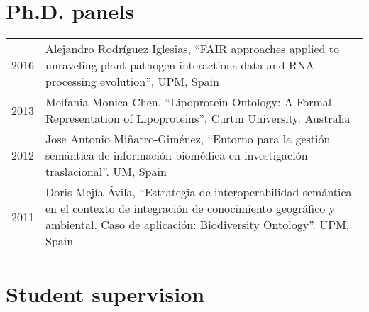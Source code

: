 \documentclass[11pt,fullpage]{article}
\begin{document}
\section*{Ph.D. panels}

\begin{longtable}{p{0.5in}|p{5.5in}}

2016 & Alejandro Rodr\'iguez Iglesias, ``FAIR approaches applied to unraveling plant-pathogen interactions data and RNA processing evolution'', UPM, Spain \\

2013 & Meifania Monica Chen, ``Lipoprotein Ontology: A Formal Representation of Lipoproteins'', Curtin University. Australia \\

2012 & Jose Antonio Mi\~narro-Gim\'enez, ``Entorno para la gesti\'on sem\'antica de informaci\'on biom\'edica en investigaci\'on traslacional''. UM, Spain \\

2011 & Doris Mej\'ia \'Avila, ``Estrategia de interoperabilidad sem\'antica en el contexto de integraci\'on de conocimiento geogr\'afico y ambiental. Caso de aplicaci\'on: Biodiversity Ontology''. UPM, Spain \\

\end{longtable}

\section*{Student supervision}
\end{document}
